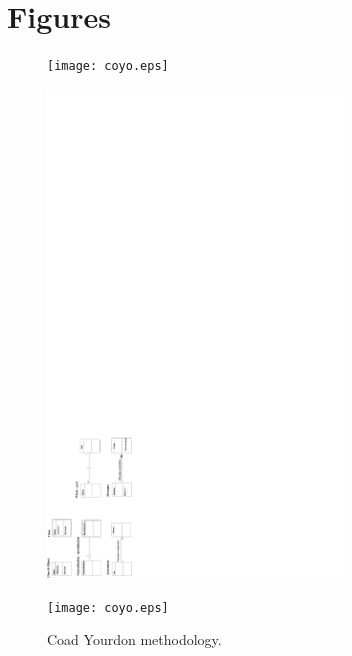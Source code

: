 \documentclass[a4paper]{article}
\begin{document}
\section{Figures}

\vspace*{-10mm}
\begin{figure}[tb]
\begin{htmlonly}
  \centerline{\texttt{[image: coyo.eps]}}
\end{htmlonly}
\ifpdf
 \centerline{\includegraphics[width=0.7\textwidth]{coyo.pdf}}
\else
 \centerline{\texttt{[image: coyo.eps]}}
\fi
\caption{Coad Yourdon methodology.}
\label{coyo}
\end{figure}
\end{document}
